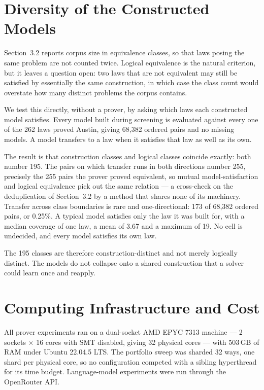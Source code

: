 \documentclass[letterpaper]{article}
\begin{document}
\section{Diversity of the Constructed Models}
\label{app:diversity}

Section~3.2 reports corpus size in equivalence classes, so that laws posing the
same problem are not counted twice. Logical equivalence is the natural
criterion, but it leaves a question open: two laws that are not equivalent may
still be satisfied by essentially the same construction, in which case the
class count would overstate how many distinct problems the corpus contains.

We test this directly, without a prover, by asking which laws each constructed
model satisfies. Every model built during screening is evaluated against every
one of the 262 laws proved Austin, giving 68,382 ordered pairs and no missing
models. A model transfers to a law when it satisfies that law as well as its
own.

The result is that construction classes and logical classes coincide exactly:
both number 195. The pairs on which transfer runs in both directions number
255, precisely the 255 pairs the prover proved equivalent, so mutual
model-satisfaction and logical equivalence pick out the same relation --- a
cross-check on the deduplication of Section~3.2 by a method that shares none of
its machinery. Transfer across class boundaries is rare and one-directional:
173 of 68,382 ordered pairs, or 0.25\%. A typical model satisfies only the law
it was built for, with a median coverage of one law, a mean of 3.67 and a
maximum of 19. No cell is undecided, and every model satisfies its own law.

The 195 classes are therefore construction-distinct and not merely logically
distinct. The models do not collapse onto a shared construction that a solver
could learn once and reapply.


\section{Computing Infrastructure and Cost}
\label{app:infra}

All prover experiments ran on a dual-socket AMD EPYC 7313 machine --- 2 sockets
$\times$ 16 cores with SMT disabled, giving 32 physical cores --- with 503\,GB
of RAM under Ubuntu 22.04.5 LTS. The portfolio sweep was sharded 32 ways, one
shard per physical core, so no configuration competed with a sibling
hyperthread for its time budget. Language-model experiments were run through
the OpenRouter API.
\end{document}
